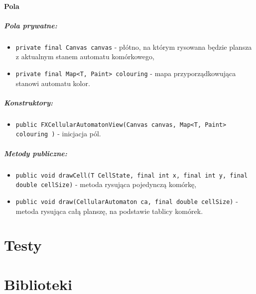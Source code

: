 \documentclass{report}
\begin{document}
\subsubsection{Pola}
\paragraph{Pola prywatne:}
\begin{itemize}
	\item \texttt{private final Canvas canvas} - płótno, na którym rysowana będzie plansza z aktualnym stanem automatu komórkowego,
	\item \texttt{private final Map<T, Paint> colouring} - mapa przyporządkowująca stanowi automatu kolor.
\end{itemize}
\paragraph{Konstruktory:}
\begin{itemize}
	\item \texttt{public FXCellularAutomatonView(Canvas canvas, Map<T, Paint> colouring )} - inicjacja pól.
\end{itemize}
\paragraph{Metody publiczne:}
\begin{itemize}
	\item \texttt{public void drawCell(T CellState, final int x, final int y, final double cellSize)} - metoda rysująca pojedynczą komórkę,
	\item \texttt{public void draw(CellularAutomaton ca, final double cellSize)} - metoda rysująca całą planszę, na podstawie tablicy komórek.
\end{itemize}



\chapter{Testy}

\chapter{Biblioteki}
\end{document}
